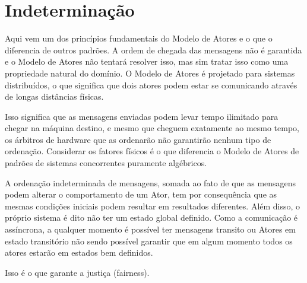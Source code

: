 \section{Indeterminação}

Aqui vem um dos princípios fundamentais do Modelo de Atores e o que o diferencia de outros padrões. A ordem de chegada das mensagens não é garantida e o Modelo de Atores não tentará resolver isso, mas sim tratar isso como uma propriedade natural do domínio. O Modelo de Atores é projetado para sistemas distribuídos, o que significa que dois atores podem estar se comunicando através de longas distâncias físicas.

Isso significa que as mensagens enviadas podem levar tempo ilimitado para chegar na máquina destino, e mesmo que cheguem exatamente ao mesmo tempo, os árbitros de hardware que as ordenarão não garantirão nenhum tipo de ordenação. Considerar os fatores físicos é o que diferencia o Modelo de Atores de padrões de sistemas concorrentes puramente algébricos.

A ordenação indeterminada de mensagens, somada ao fato de que as mensagens podem alterar o comportamento de um Ator, tem por consequência que as mesmas condições iniciais podem resultar em resultados diferentes. Além disso, o próprio sistema é dito não ter um estado global definido. Como a comunicação é assíncrona, a qualquer momento é possível ter mensagens transito ou Atores em estado transitório não sendo possível garantir que em algum momento todos os atores estarão em estados bem definidos.

Isso é o que garante a justiça (fairness).
